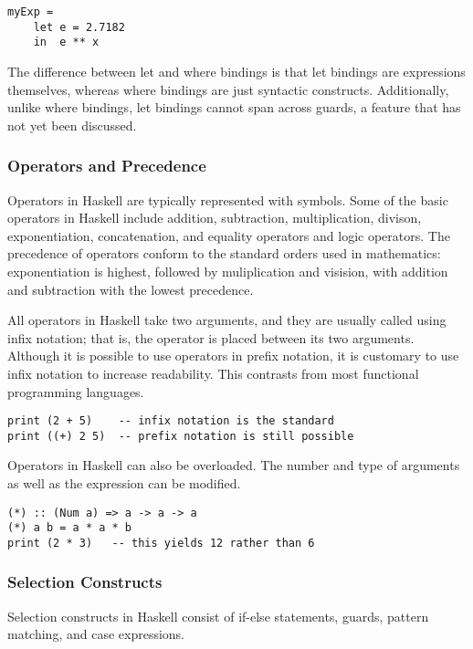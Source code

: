 \documentclass[titlepage,12pt]{article}
\begin{document}
\begin{verbatim}
myExp =
    let e = 2.7182
    in  e ** x
\end{verbatim}

The difference between let and where bindings is that let bindings are expressions themselves, whereas where bindings are just syntactic constructs. Additionally, unlike where bindings, let bindings cannot span across guards, a feature that has not yet been discussed.

\subsubsection{Operators and Precedence}

Operators in Haskell are typically represented with symbols. Some of the basic operators in Haskell include addition, subtraction, multiplication, divison, exponentiation, concatenation, and equality operators and logic operators. The precedence of operators conform to the standard orders used in mathematics: exponentiation is highest, followed by muliplication and visision, with addition and subtraction with the lowest precedence.  

All operators in Haskell take two arguments, and they are usually called using infix notation; that is, the operator is placed between its two arguments. Although it is possible to use operators in prefix notation, it is customary to use infix notation to increase readability. This contrasts from most functional programming languages. 

\begin{verbatim}
print (2 + 5)    -- infix notation is the standard
print ((+) 2 5)  -- prefix notation is still possible
\end{verbatim}

Operators in Haskell can also be overloaded. The number and type of arguments as well as the expression can be modified. 

\begin{verbatim}
(*) :: (Num a) => a -> a -> a
(*) a b = a * a * b
print (2 * 3)   -- this yields 12 rather than 6
\end{verbatim}

\subsubsection{Selection Constructs}

Selection constructs in Haskell consist of if-else statements, guards, pattern matching, and case expressions. 
\end{document}
